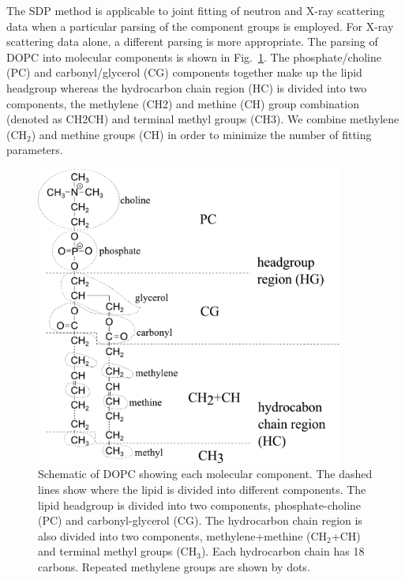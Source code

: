 The SDP method is applicable to joint fitting of neutron and X-ray scattering data 
when a particular parsing of the component groups is employed.  
For X-ray scattering data alone, a different parsing is more appropriate.  
The parsing of DOPC into molecular components is shown in
Fig.~\ref{fig:dopc_schematic}. The phosphate/choline (\acs{PC}) and 
carbonyl/glycerol (\acs{CG}) components together make up the lipid headgroup
whereas the hydrocarbon chain region (\acs{HC})
is divided into two components, the methylene (\gls{CH2}) and methine (\gls{CH}) group
combination (denoted as \gls{CH2CH}) and terminal methyl groups (\gls{CH3}). 
We combine methylene (CH$_2$) and methine groups (CH) in order to 
minimize the number of fitting parameters.

\begin{figure}[htbp]
  \centering
  \includegraphics[width=0.9\textwidth]{figures/Tat/MMs/dopc_schematic.pdf}
  \caption[Schematic of DOPC showing each molecular component]
  {Schematic of DOPC showing each molecular component. The dashed lines 
  show where the lipid is divided into different components. 
  The lipid headgroup
  is divided into two components, phosphate-choline (PC) and carbonyl-glycerol (CG). 
  The hydrocarbon chain region is also divided
  into two components, methylene+methine (CH$_2$+CH) and terminal methyl groups (CH$_3$).
  Each hydrocarbon chain has 18 carbons. Repeated methylene groups 
  are shown by dots.}
  \label{fig:dopc_schematic}
\end{figure}


